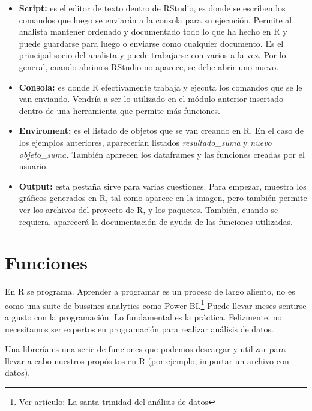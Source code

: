 \documentclass[
  letterpaper,
  DIV=11,
  numbers=noendperiod]{scrreprt}
\begin{document}
\begin{itemize}
\item
  \textbf{Script:} es el editor de texto dentro de RStudio, es donde se
  escriben los comandos que luego se enviarán a la consola para su
  ejecución. Permite al analista mantener ordenado y documentado todo lo
  que ha hecho en R y puede guardarse para luego o enviarse como
  cualquier documento. Es el principal socio del analista y puede
  trabajarse con varios a la vez. Por lo general, cuando abrimos RStudio
  no aparece, se debe abrir uno nuevo.
\item
  \textbf{Consola:} es donde R efectivamente trabaja y ejecuta los
  comandos que se le van enviando. Vendría a ser lo utilizado en el
  módulo anterior insertado dentro de una herramienta que permite más
  funciones.
\item
  \textbf{Enviroment:} es el listado de objetos que se van creando en R.
  En el caso de los ejemplos anteriores, aparecerían listados
  \emph{resultado\_suma} y \emph{nuevo objeto\_suma.} También aparecen
  los dataframes y las funciones creadas por el usuario.
\item
  \textbf{Output:} esta pestaña sirve para varias cuestiones. Para
  empezar, muestra los gráficos generados en R, tal como aparece en la
  imagen, pero también permite ver los archivos del proyecto de R, y los
  paquetes. También, cuando se requiera, aparecerá la documentación de
  ayuda de las funciones utilizadas.
\end{itemize}

\hypertarget{funciones}{%
\section{Funciones}\label{funciones}}

En R se programa. Aprender a programar es un proceso de largo aliento,
no es como una suite de bussines analytics como Power BI.\footnote{Ver
  artículo:
  \href{https://www.linkedin.com/pulse/la-santa-trinidad-del-an\%25C3\%25A1lisis-de-datos-daniel-blanc/?trackingId=gthGpbnJTJWapZz79uRNlQ\%3D\%3D}{La
  santa trinidad del análisis de datos}} Puede llevar meses sentirse a
gusto con la programación. Lo fundamental es la práctica. Felizmente, no
necesitamos ser expertos en programación para realizar análisis de
datos.

Una librería es una serie de funciones que podemos descargar y utilizar
para llevar a cabo nuestros propósitos en R (por ejemplo, importar un
archivo con datos).
\end{document}
